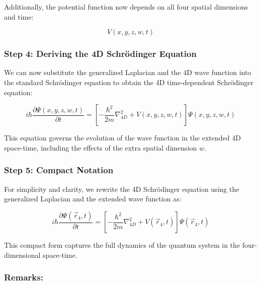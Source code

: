 \documentclass[12pt]{article}
\begin{document}
Additionally, the potential function now depends on all four spatial dimensions and time:

\begin{equation}
V(x, y, z, w, t)
\end{equation}

\subsubsection*{Step 4: Deriving the 4D Schrödinger Equation}

We can now substitute the generalized Laplacian and the 4D wave function into the standard Schrödinger equation to obtain the 4D time-dependent Schrödinger equation:

\begin{equation}
i \hbar \frac{\partial \Psi(x, y, z, w, t)}{\partial t} = \left[ -\frac{\hbar^2}{2m} \nabla^2_{4D} + V(x, y, z, w, t) \right] \Psi(x, y, z, w, t)
\end{equation}

This equation governs the evolution of the wave function in the extended 4D space-time, including the effects of the extra spatial dimension \( w \).

\subsubsection*{Step 5: Compact Notation}

For simplicity and clarity, we rewrite the 4D Schrödinger equation using the generalized Laplacian and the extended wave function as:

\begin{equation}
i \hbar \frac{\partial \Psi(\vec{r}_4, t)}{\partial t} = \left[ -\frac{\hbar^2}{2m} \nabla^2_{4D} + V(\vec{r}_4, t) \right] \Psi(\vec{r}_4, t)
\end{equation}

This compact form captures the full dynamics of the quantum system in the four-dimensional space-time.

\subsubsection*{Remarks:}
\end{document}
